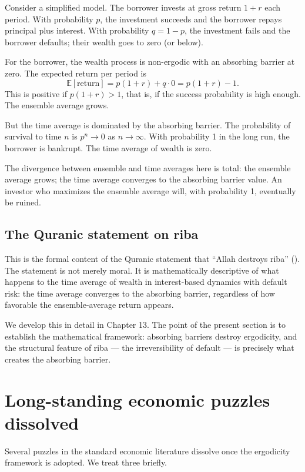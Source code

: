 Consider a simplified model. The borrower invests at gross return
$1+r$ each period. With probability $p$, the investment succeeds
and the borrower repays principal plus interest. With probability
$q = 1 - p$, the investment fails and the borrower defaults; their
wealth goes to zero (or below).

For the borrower, the wealth process is non-ergodic with an
absorbing barrier at zero. The expected return per period is
\[
    \mathbb{E}[\text{return}] = p(1 + r) + q \cdot 0 = p(1 + r) - 1.
\]
This is positive if $p(1+r) > 1$, that is, if the success
probability is high enough. The ensemble average grows.

But the time average is dominated by the absorbing barrier. The
probability of survival to time $n$ is $p^n \to 0$ as $n \to
\infty$. With probability 1 in the long run, the borrower is
bankrupt. The time average of wealth is zero.

The divergence between ensemble and time averages here is total: the
ensemble average grows; the time average converges to the absorbing
barrier value. An investor who maximizes the ensemble average will,
with probability 1, eventually be ruined.

\subsection{The Quranic statement on riba}

This is the formal content of the Quranic statement that ``Allah
destroys riba'' (). The statement is not merely moral.
It is mathematically descriptive of what happens to the time average
of wealth in interest-based dynamics with default risk: the time
average converges to the absorbing barrier, regardless of how
favorable the ensemble-average return appears.

We develop this in detail in Chapter 13. The point of the present
section is to establish the mathematical framework: absorbing
barriers destroy ergodicity, and the structural feature of riba ---
the irreversibility of default --- is precisely what creates the
absorbing barrier.

\section{Long-standing economic puzzles dissolved}
\label{sec:dissolved-puzzles}

Several puzzles in the standard economic literature dissolve once
the ergodicity framework is adopted. We treat three briefly.


